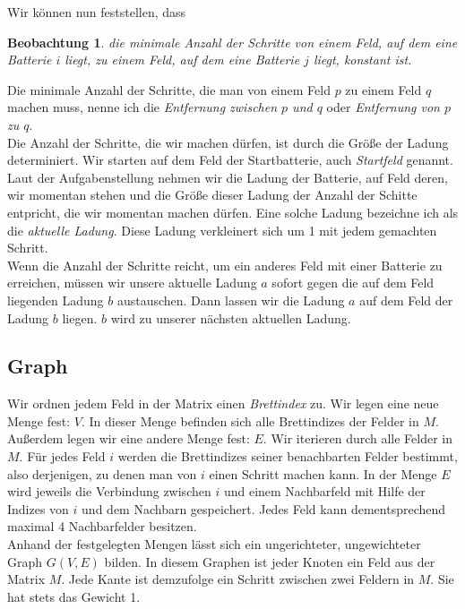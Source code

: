 \documentclass[a4paper,10pt,ngerman]{scrartcl}
\newtheorem{lemma}{Beobachtung}
\newcommand{\TODO}[1]{\todo[inline]{#1}}
\begin{document}
Wir können nun feststellen, dass
\begin{lemma}\label{observ:distances}
die minimale Anzahl der Schritte von einem Feld, auf dem eine Batterie $i$ liegt, zu einem Feld, 
auf dem eine Batterie $j$ liegt, konstant ist.
\end{lemma}

Die minimale Anzahl der Schritte, die man von einem Feld $p$ zu einem Feld $q$ machen muss, nenne
ich die \textit{Entfernung zwischen $p$ und $q$} oder \textit{Entfernung von $p$ zu $q$}.\\

Die Anzahl der Schritte, die wir machen dürfen, ist durch die Größe der Ladung determiniert.
Wir starten auf dem Feld der Startbatterie, auch \textit{Startfeld} genannt.
Laut der Aufgabenstellung nehmen wir die Ladung der Batterie, auf Feld deren, wir momentan stehen und 
die Größe dieser Ladung der Anzahl der Schitte entpricht, die wir momentan machen dürfen. 
Eine solche Ladung bezeichne ich als die \textit{aktuelle Ladung}. Diese Ladung verkleinert sich um 1
mit jedem gemachten Schritt.\\
Wenn die Anzahl der Schritte reicht, um ein anderes Feld mit einer Batterie zu erreichen, müssen wir
unsere aktuelle Ladung $a$ sofort gegen die auf dem Feld liegenden Ladung $b$ austauschen. Dann lassen
wir die Ladung $a$ auf dem Feld der Ladung $b$ liegen. $b$ wird zu unserer nächsten aktuellen Ladung. 

\TODO{TODO: Include Eingabeindex \texttt{inputID}}

\subsection{Graph}
Wir ordnen jedem Feld in der Matrix einen \textit{Brettindex} zu.
Wir legen eine neue Menge fest: $V$. In dieser Menge befinden sich alle Brettindizes der Felder in $M$.
Außerdem legen wir eine andere Menge fest: $E$.
Wir iterieren durch alle Felder in $M$. Für jedes Feld $i$ werden die Brettindizes seiner benachbarten Felder bestimmt,
also derjenigen, zu denen man von $i$ einen Schritt machen kann.
In der Menge $E$ wird jeweils die Verbindung zwischen $i$ und einem Nachbarfeld mit Hilfe der Indizes von $i$ 
und dem Nachbarn gespeichert. Jedes Feld kann dementsprechend maximal 4 Nachbarfelder besitzen.\\

Anhand der festgelegten Mengen lässt sich ein ungerichteter, ungewichteter Graph $G(V, E)$ bilden.
In diesem Graphen ist jeder Knoten ein Feld aus der Matrix $M$. Jede Kante ist demzufolge ein
Schritt zwischen zwei Feldern in $M$. Sie hat stets das Gewicht 1.
\end{document}
